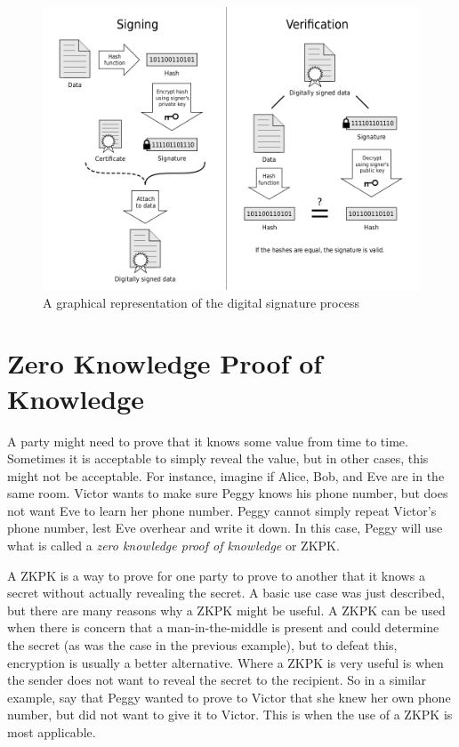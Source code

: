 \begin{figure}[h]
\includegraphics[width=500px]{images/signing.png}
\caption{A graphical representation of the digital signature process \cite{signing}}
\label{fig:signing}
\end{figure}


\section{Zero Knowledge Proof of Knowledge}
A party might need to prove that it knows some value from time to time. Sometimes it is acceptable
to simply reveal the value, but in other cases, this might not be acceptable. For instance, imagine
if Alice, Bob, and Eve are in the same room. Victor  wants to make sure Peggy knows his phone number,
but does not want Eve to learn her phone number. Peggy cannot simply repeat Victor's phone
number, lest Eve overhear and write it down. In this case, Peggy will use what is called a
\textit{zero knowledge proof of knowledge} or ZKPK.

A ZKPK is a way to prove for one party to prove to another that it knows a secret without actually
revealing the secret. A basic use case was just described, but there are many reasons why a ZKPK
might be useful. A ZKPK can be used when there is concern that a man-in-the-middle is present
and could determine the secret (as was the case in the previous example), but to defeat this,
encryption is usually a better alternative. Where a ZKPK is very useful is when the sender does not
want to reveal the secret to the recipient. So in a similar example, say that Peggy wanted to prove to
Victor that she knew her own phone number, but did not want to give it to Victor. This is when the
use of a ZKPK is most applicable.

